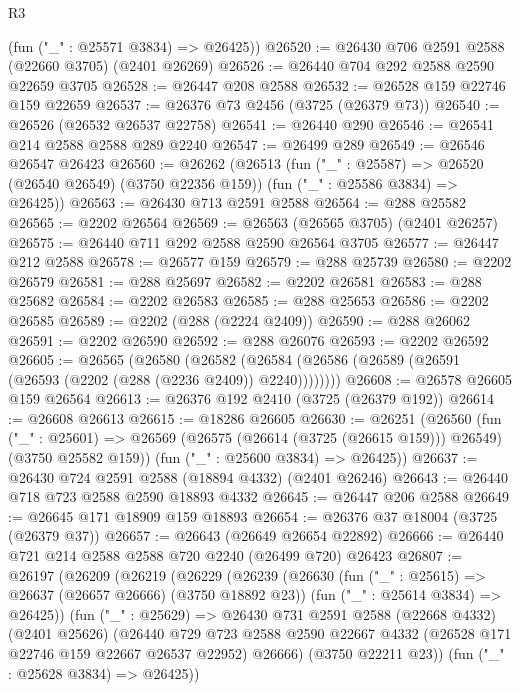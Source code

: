 \begin{lexlean}{R3}
\begin{coremodule}
      (fun ("_" : @25571 @3834) => @26425))
@26520 := @26430 @706 @2591 @2588 (@22660 @3705) (@2401 @26269)
@26526 := @26440 @704 @292 @2588 @2590 @22659 @3705
@26528 := @26447 @208 @2588
@26532 := @26528 @159 @22746 @159 @22659
@26537 := @26376 @73 @2456 (@3725 (@26379 @73))
@26540 := @26526 (@26532 @26537 @22758)
@26541 := @26440 @290
@26546 := @26541 @214 @2588 @2588 @289 @2240
@26547 := @26499 @289
@26549 := @26546 @26547 @26423
@26560 := @26262
    (@26513
      (fun ("_" : @25587) => @26520 (@26540 @26549) (@3750 @22356 @159))
      (fun ("_" : @25586 @3834) => @26425))
@26563 := @26430 @713 @2591 @2588
@26564 := @288 @25582
@26565 := @2202 @26564
@26569 := @26563 (@26565 @3705) (@2401 @26257)
@26575 := @26440 @711 @292 @2588 @2590 @26564 @3705
@26577 := @26447 @212 @2588
@26578 := @26577 @159
@26579 := @288 @25739
@26580 := @2202 @26579
@26581 := @288 @25697
@26582 := @2202 @26581
@26583 := @288 @25682
@26584 := @2202 @26583
@26585 := @288 @25653
@26586 := @2202 @26585
@26589 := @2202 (@288 (@2224 @2409))
@26590 := @288 @26062
@26591 := @2202 @26590
@26592 := @288 @26076
@26593 := @2202 @26592
@26605 := @26565
    (@26580
      (@26582 (@26584 (@26586 (@26589 (@26591 (@26593 (@2202 (@288 (@2236 @2409)) @2240))))))))
@26608 := @26578 @26605 @159 @26564
@26613 := @26376 @192 @2410 (@3725 (@26379 @192))
@26614 := @26608 @26613
@26615 := @18286 @26605
@26630 := @26251
    (@26560
      (fun ("_" : @25601) =>
      @26569 (@26575 (@26614 (@3725 (@26615 @159))) @26549) (@3750 @25582 @159))
      (fun ("_" : @25600 @3834) => @26425))
@26637 := @26430 @724 @2591 @2588 (@18894 @4332) (@2401 @26246)
@26643 := @26440 @718 @723 @2588 @2590 @18893 @4332
@26645 := @26447 @206 @2588
@26649 := @26645 @171 @18909 @159 @18893
@26654 := @26376 @37 @18004 (@3725 (@26379 @37))
@26657 := @26643 (@26649 @26654 @22892)
@26666 := @26440 @721 @214 @2588 @2588 @720 @2240 (@26499 @720) @26423
@26807 := @26197
    (@26209
      (@26219
        (@26229
          (@26239
            (@26630
              (fun ("_" : @25615) => @26637 (@26657 @26666) (@3750 @18892 @23))
              (fun ("_" : @25614 @3834) => @26425))
            (fun ("_" : @25629) =>
            @26430
              @731
              @2591
              @2588
              (@22668 @4332)
              (@2401 @25626)
              (@26440
                @729
                @723
                @2588
                @2590
                @22667
                @4332
                (@26528 @171 @22746 @159 @22667 @26537 @22952)
                @26666)
              (@3750 @22211 @23))
            (fun ("_" : @25628 @3834) => @26425))

\end{coremodule}
\end{lexlean}
